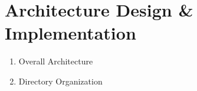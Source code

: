 \newpage
\section{\Large{Architecture Design \& Implementation}}

\begin{enumerate}[label=\arabic*]

\newcommand{\addImage}[2]{
        \begin{figure}[!htb]
            \begin{center}
                \texttt{[image: \#1]}
                \caption{#2} %
                \renewcommand{\thefigure}{\thesubsection.\arabic{figure}}
            \end{center}
        \end{figure}
        
    }
    \item {\large{Overall Architecture}}\\

    \item {\large{Directory Organization}}\\
    

\end{enumerate}
